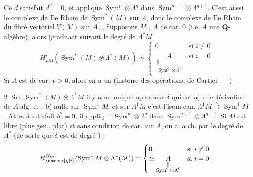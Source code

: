 Ce $d$  satisfait $d^2=0$, et applique $\operatorname{Sym}^p\otimes\Lambda^q$ dans $\operatorname{Sym}^{p-1}\otimes\Lambda^{q+1}$.   C'est aussi le complexe de De Rham de $\operatorname{Sym}^*(M)$ sur $A$, donc le complexe de De Rham du fibré vectoriel $V(M)$ sur $A$. ,
Supposons $M$ ,  $A$ de car. $0$ (i.e. $A$ une $\mathbf Q$-algèbre), alors
(graduant suivant le degré de $\Lambda^*M$
\[
H^i_{DR}(\operatorname{Sym}^*(M)\otimes\Lambda^*(M))\simeq
\begin{cases}0&\text{si }i\neq0\\
\underset{\substack{\Vert\\\operatorname{Sym}^0\otimes\Lambda^0}}{A}&\text{si }i=0
\end{cases}
\]
Si $A$ est de car. $p>0$,  alors on a un (histoire des opérations, de Cartier ----)

\textcircled{2} Sur $\operatorname{Sym}^*(M)\otimes\Lambda^*M$  il y a un unique opérateur $\delta$ qui est  a) une dérivation  de $A$-alg.  et , b) nulle sur  $\operatorname{Sym}^1M$, et sur $\Lambda^1M$ c'est l'isom can. $\Lambda^1M\xrightarrow{\sim}\operatorname{Sym}^1M$. Alors $\delta$ satisfait $\delta^2=0$, il applique $\operatorname{Sym}^p\otimes\Lambda^q$ dans $\operatorname{Sym}^{p+1}\otimes\Lambda^{q-1}$. Si $M$ est libre (plus gén., plat) et sans condition de car. sur $A$, on a   la ch. par le degré de $\Lambda^*$  (de sorte que $\delta$ est de degré ) :
\[
H^{\mathrm{Kos}}_{\unsure{q|i}}(\operatorname{Sym}^*M\otimes\Lambda^*(M))=
\begin{cases}0&\text{si }i\neq0\\
\simeq\underset{\substack{\Vert\\\operatorname{Sym}^0\otimes\Lambda^0}}{A}&\text{si }i=0
\end{cases}.
\]

